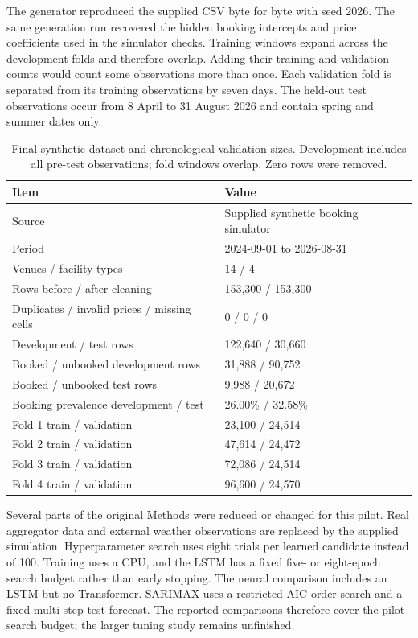 The generator reproduced the supplied CSV byte for byte with seed 2026. The same generation run recovered the hidden booking intercepts and price coefficients used in the simulator checks. Training windows expand across the development folds and therefore overlap. Adding their training and validation counts would count some observations more than once. Each validation fold is separated from its training observations by seven days. The held-out test observations occur from 8 April to 31 August 2026 and contain spring and summer dates only.


\begin{table}[t]
\centering
\caption{Final synthetic dataset and chronological validation sizes. Development includes all pre-test observations; fold windows overlap. Zero rows were removed.}
\label{tab:data}
\footnotesize
\setlength{\tabcolsep}{3.5pt}
\begin{tabular}{p{}p{}}
\toprule
Item & Value \\
\midrule
Source & Supplied synthetic booking simulator \\
Period & 2024-09-01 to 2026-08-31 \\
Venues / facility types & 14 / 4 \\
Rows before / after cleaning & 153,300 / 153,300 \\
Duplicates / invalid prices / missing cells & 0 / 0 / 0 \\
Development / test rows & 122,640 / 30,660 \\
Booked / unbooked development rows & 31,888 / 90,752 \\
Booked / unbooked test rows & 9,988 / 20,672 \\
Booking prevalence development / test & 26.00\% / 32.58\% \\
Fold 1 train / validation & 23,100 / 24,514 \\
Fold 2 train / validation & 47,614 / 24,472 \\
Fold 3 train / validation & 72,086 / 24,514 \\
Fold 4 train / validation & 96,600 / 24,570 \\
\bottomrule
\end{tabular}
\end{table}

Several parts of the original Methods were reduced or changed for this pilot. Real aggregator data and external weather observations are replaced by the supplied simulation. Hyperparameter search uses eight trials per learned candidate instead of 100. Training uses a CPU, and the LSTM has a fixed five- or eight-epoch search budget rather than early stopping. The neural comparison includes an LSTM but no Transformer. SARIMAX uses a restricted AIC order search and a fixed multi-step test forecast. The reported comparisons therefore cover the pilot search budget; the larger tuning study remains unfinished.

